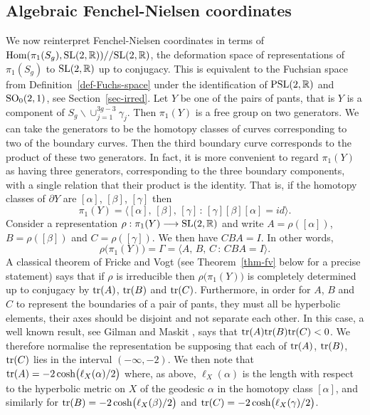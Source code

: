 \documentclass[11pt]{amsart}
\numberwithin{equation}{section}
\begin{document}
\subsection{Algebraic Fenchel-Nielsen coordinates}\label{sec:alg-FN}

We now reinterpret Fenchel-Nielsen coordinates in terms of 
${\rm Hom}(\pi_1(S_g), {\rm SL}(2,{\mathbb R}))// {\rm SL}(2,{\mathbb R})$, 
the deformation space of representations of $\pi_1(S_g)$ to ${\rm SL}(2,{\mathbb R})$ up to conjugacy. 
This is equivalent to the Fuchsian space from Definition~\ref{def-Fuchs-space} under the identification of
${\rm PSL}(2,{\mathbb R})$ and ${\rm SO}_0(2,1)$, see Section~\ref{sec-irred}.
Let $Y$ be one of the
pairs of pants, that is $Y$ is a component of $S_g\backslash\cup_{j=1}^{3g-3}\gamma_j$. 
Then $\pi_1(Y)$ is a free group on two generators. 
We can take the generators to be the homotopy classes of curves corresponding to two of the boundary curves. Then the third
boundary curve corresponds to the product of these two generators. In fact, it is more convenient to regard $\pi_1(Y)$
as having three generators, corresponding to the three boundary components, with a single relation that their product is
the identity. That is, if the homotopy classes of $\partial Y$ are $[\alpha]$, $[\beta]$, $[\gamma]$ then 
$$
\pi_1(Y)=\bigl\langle [\alpha],\,[\beta],\,[\gamma]\, :\,  [\gamma][\beta][\alpha]=id\bigr\rangle.
$$
Consider a representation $\rho:\pi_1(Y)\longrightarrow {\rm SL}(2,{\mathbb R})$ and write $A=\rho([\alpha])$,
$B=\rho([\beta])$ and $C=\rho([\gamma])$. We then have $CBA=I$. In other words,
$$
\rho\bigl(\pi_1(Y)\bigr)=\Gamma=\langle A,\,B,\,C\,:\,CBA=I\rangle.
$$
A classical theorem of Fricke and Vogt (see Theorem~\ref{thm-fv} below for a precise statement) says that if 
$\rho$ is irreducible then $\rho\bigl(\pi_1(Y)\bigr)$ is
completely determined up to conjugacy by ${\rm tr}(A)$, ${\rm tr}(B)$ and ${\rm tr}(C)$. Furthermore, in order for $A$, $B$
and $C$ to represent the boundaries of a pair of pants, they must all be hyperbolic elements, their axes should be disjoint
and not separate each other. In this case, a well known result, see Gilman and Maskit \cite{G-M}, says that
${\rm tr}(A){\rm tr}(B){\rm tr}(C)<0$. We therefore normalise the representation be supposing that each of 
${\rm tr}(A)$, ${\rm tr}(B)$, ${\rm tr}(C)$ lies in the interval $(-\infty, -2)$. We then note that
${\rm tr}(A)=-2\cosh\bigl(\ell_X(\alpha)/2\bigr)$ where, as above, $\ell_X(\alpha)$ is the length with respect 
to the hyperbolic metric on $X$ of the geodesic $\alpha$ in the homotopy class $[\alpha]$, and similarly for 
${\rm tr}(B)=-2\cosh\bigl(\ell_X(\beta)/2\bigr)$ and ${\rm tr}(C)=-2\cosh\bigl(\ell_X(\gamma)/2\bigr)$.
\end{document}
